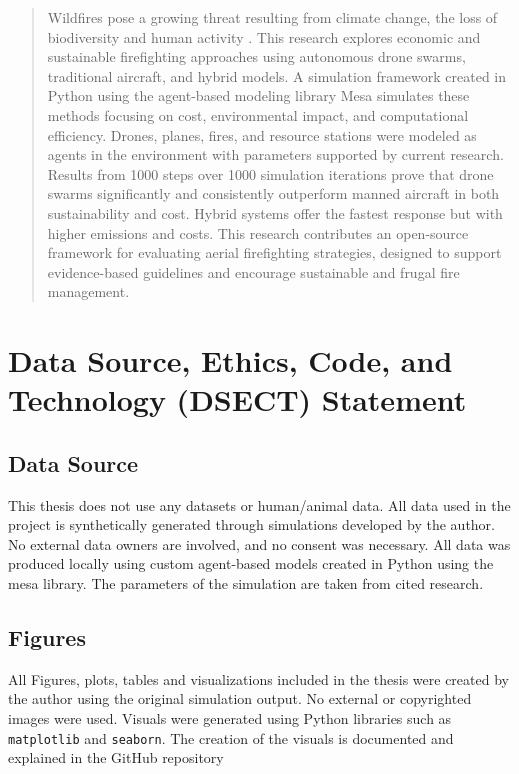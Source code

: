 \documentclass[twoside]{article}
\begin{document}
\begin{abstract}
Wildfires pose a growing threat resulting from climate change, the loss of biodiversity and human activity \citep{copernicus-wildfires}. This research explores economic and sustainable firefighting approaches using autonomous drone swarms, traditional aircraft, and hybrid models. A simulation framework created in Python using the agent-based modeling library Mesa \citep{terMesa} simulates these methods focusing on cost, environmental impact, and computational efficiency. Drones, planes, fires, and resource stations were modeled as agents in the environment with parameters supported by current research. Results from 1000 steps over 1000 simulation iterations prove that drone swarms significantly and consistently outperform manned aircraft in both sustainability and cost. Hybrid systems offer the fastest response but with higher emissions and costs. This research contributes an open-source framework for evaluating aerial firefighting strategies, designed to support evidence-based guidelines and encourage sustainable and frugal fire management.
\end{abstract}

\section{Data Source, Ethics, Code, and Technology (DSECT) Statement}
\label{sec:CodeOfCondunt}

\subsection{Data Source}

This thesis does not use any datasets or human/animal data. All data used in the project is synthetically generated through simulations developed by the author. No external data owners are involved, and no consent was necessary. All data was produced locally using custom agent-based models created in Python using the mesa library. The parameters of the simulation are taken from cited research.

\subsection{Figures}

All Figures, plots, tables and visualizations included in the thesis were created by the author using the original simulation output. No external or copyrighted images were used. Visuals were generated using Python libraries such as \texttt{matplotlib} and \texttt{seaborn}. The creation of the visuals is documented and explained in the GitHub repository \citep{AgentBasedFirefightingModel_repository}
\end{document}
